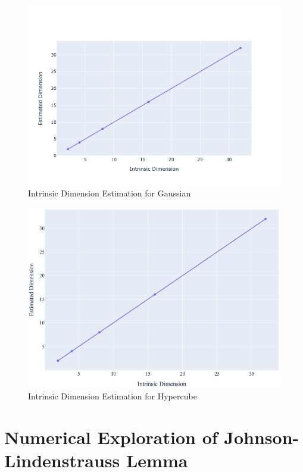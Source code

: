 \documentclass{article}
\begin{document}
    \begin{figure}[h]
        \label{fig:gaussian_intrinsic_dim} 
        \includegraphics[width=\linewidth]{images/q6/gaussian.png}
        \caption{Intrinsic Dimension Estimation for Gaussian}
    \end{figure}

    \begin{figure}[h]
        \label{fig:hypercube_intrinsic_dim} 
        \includegraphics[width=\linewidth]{images/q6/hypercube.png}
        \caption{Intrinsic Dimension Estimation for Hypercube}
    \end{figure}

    \clearpage

\section{Numerical Exploration of Johnson-Lindenstrauss Lemma}
\end{document}
